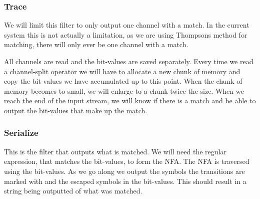 



\subsubsection{Trace}

We will limit this filter to only output one channel with a match. In
the current system this is not actually a limitation, as we are using
Thompsons method for matching, there will only ever be one channel
with a match.

All channels are read and the bit-values are saved separately. Every
time we read a channel-split operator we will have to allocate a new
chunk of memory and copy the bit-values we have accumulated up to this
point. When the chunk of memory becomes to small, we will enlarge to a
chunk twice the size. When we reach the end of the input stream, we
will know if there is a match and be able to output the bit-values
that make up the match.

\subsubsection{Serialize}
  
This is the filter that outputs what is matched. We will need the
regular expression, that matches the bit-values, to form the NFA. The
NFA is traversed using the bit-values. As we go along we output the
symbols the transitions are marked with and the escaped symbols in the
bit-values. This should result in a string being outputted of what was
matched.
